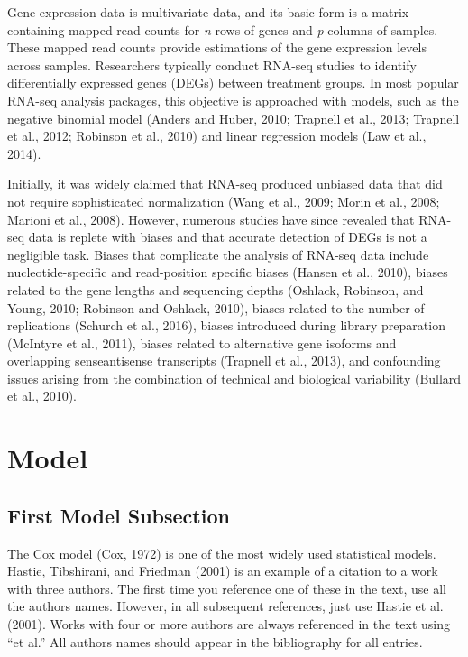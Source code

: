 \documentclass[useAMS,referee]{biom}
\begin{document}
Gene expression data is multivariate data, and its basic form is a matrix containing mapped read counts for \textit{n} rows of genes and \textit{p} columns of samples. These mapped read counts provide estimations of the gene expression levels across samples. Researchers typically conduct RNA-seq studies to identify differentially expressed genes (DEGs) between treatment groups. In most popular RNA-seq analysis packages, this objective is approached with models, such as the negative binomial model (Anders and Huber, 2010; Trapnell et al., 2013; Trapnell et al., 2012; Robinson et al., 2010) and linear regression models (Law et al., 2014).

Initially, it was widely claimed that RNA-seq produced unbiased data that did not require sophisticated normalization (Wang et al., 2009; Morin et al., 2008; Marioni et al., 2008). However, numerous studies have since revealed that RNA-seq data is replete with biases and that accurate detection of DEGs is not a negligible task. Biases that complicate the analysis of RNA-seq data include nucleotide-specific and read-position specific biases (Hansen et al., 2010), biases related to the gene lengths and sequencing depths (Oshlack, Robinson, and Young, 2010; Robinson and Oshlack, 2010), biases related to the number of replications (Schurch et al., 2016), biases introduced during library preparation (McIntyre et al., 2011), biases related to alternative gene isoforms and overlapping senseantisense transcripts (Trapnell et al., 2013), and confounding issues arising from the combination of technical and biological variability (Bullard et al., 2010).




\section{Model}
\label{s:model}

\subsection{First Model Subsection}

The Cox model (Cox, 1972) is one of the most widely used statistical
models.  Hastie, Tibshirani, and Friedman (2001) is an example of a
citation to a work with three authors.  The first time you reference
one of these in the text, use all the authors names. However, in all
subsequent references, just use Hastie et al. (2001).  Works with four
or more authors are always referenced in the text using ``et al.''
All authors names should appear in the bibliography for all entries.
\end{document}
